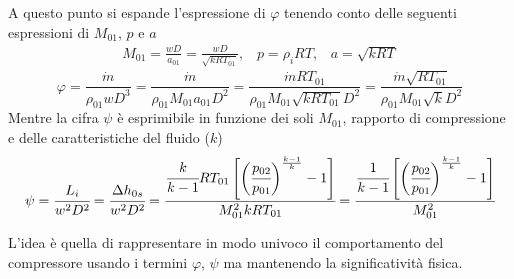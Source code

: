 A questo punto si espande l'espressione di $\varphi$ tenendo conto delle seguenti espressioni di $M_{01}$, $p$ e $a$
\begin{align*}
M_{01}=\frac{w D}{a_{01}}= \frac{w D}{\sqrt{k R T_{01}}}, \;\;\;p = \rho_i RT, \;\;\; a = \sqrt{k R T}
\end{align*}
\begin{equation}
\varphi = \frac{\dot{m}}{\rho_{01} w D^3} = \frac{\dot{m}}{\rho_{01} M_{01} a_{01} D^2} = \frac{\dot{m} R T_{01}}{\rho_{01} M_{01} \sqrt{k R T_{01}} D^2} = \frac{\dot{m} \sqrt{R T_{01}}}{\rho_{01} M_{01} \sqrt{k} D^2}
\end{equation}
Mentre la cifra $\psi$ è esprimibile in funzione dei soli $M_{01}$, rapporto di compressione e delle caratteristiche del fluido ($k$)
\begin{equation}
\psi = \cfrac{L_i}{w^2 D^2} = \cfrac{\Delta h_{0s}}{w^ 2 D^2} = \cfrac{\cfrac{k}{k-1} R T_{01}\left[ \bigg( \cfrac{p_{02}}{p_{01}} \bigg)^{\frac{k-1}{k}}-1\right]}{M_{01}^2 k R T_{01}} = \cfrac{\cfrac{1}{k-1} \left[ \bigg( \cfrac{p_{02}}{p_{01}} \bigg)^{\frac{k-1}{k}}-1\right]}{M_{01}^2 }
\end{equation}

L'idea è quella di rappresentare in modo univoco il comportamento del compressore usando i termini $\varphi$, $\psi$ ma mantenendo la significatività fisica.

